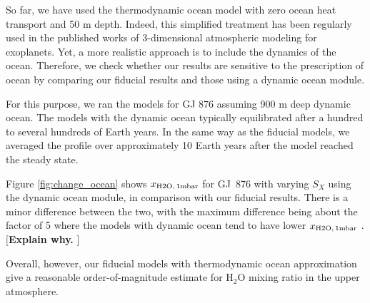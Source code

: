 \documentclass[11pt,numberedappendix,twocolappendix,]{emulateapj}
\def\water{H$_2$O }
\def\xwater{$x_{\rm H2O,\,1mbar}$ }
\def\memo#1{\color{red}$[${\bf #1}$]$ \color{black}}
\begin{document}
So far, we have used the thermodynamic ocean model with zero ocean heat transport and 50 m depth. 
Indeed, this simplified treatment has been regularly used in the published works of 3-dimensional atmospheric modeling for exoplanets. 
Yet, a more realistic approach is to include the dynamics of the ocean. 
Therefore, we check whether our results are sensitive to the prescription of ocean by comparing our fiducial results and those using a dynamic ocean module. 

For this purpose, we ran the models for GJ 876 assuming 900 m deep dynamic ocean. 
The models with the dynamic ocean typically equilibrated after a hundred to several hundreds of Earth years. 
In the same way as the fiducial models, we averaged the profile over approximately 10 Earth years after the model reached the steady state. 

Figure \ref{fig:change_ocean} shows \xwater for GJ~876 with varying $S_X$ using the dynamic ocean module, in comparison with our fiducial results.  
There is a minor difference between the two, with the maximum difference being about the factor of 5 where the models with dynamic ocean tend to have lower \xwater. 
\memo{Explain why. }

Overall, however, our fiducial models with thermodynamic ocean approximation give a reasonable order-of-magnitude estimate for \water mixing ratio in the upper atmosphere. 
\end{document}

